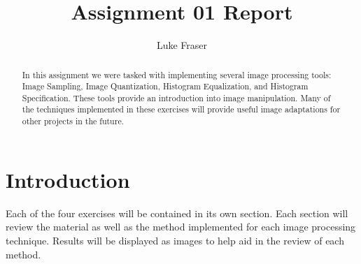 \documentclass[letterpaper,10pt]{article}
\title{Assignment 01 Report}
\author{Luke Fraser}
\begin{document}
\maketitle

\begin{abstract}
In this assignment we were tasked with implementing several image processing tools: Image Sampling, Image Quantization, Histogram Equalization, and Histogram Specification. These tools provide an introduction into image manipulation. Many of the techniques implemented in these exercises will provide useful image adaptations for other projects in the future.
\end{abstract}

\section{Introduction}
Each of the four exercises will be contained in its own section. Each section will review the material as well as the method implemented for each image processing technique. Results will be displayed as images to help aid in the review of each method.
\end{document}
